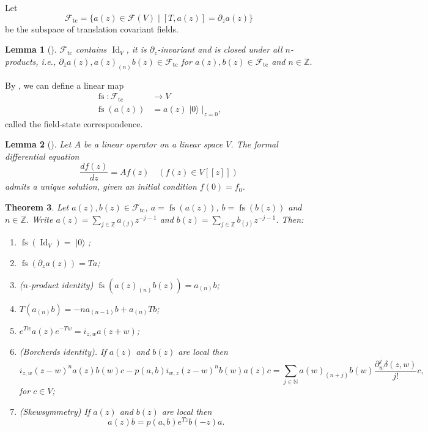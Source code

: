 \documentclass[a4paper, 12pt, reqno]{amsart}
\newtheorem{theorem}{Theorem}[section]
\newtheorem{lemma}[theorem]{Lemma}
\theoremstyle{remark}
\numberwithin{equation}{subsection}
\DeclareMathOperator{\Id}{Id}
\DeclareMathOperator{\vac}{|0\rangle}
\DeclareMathOperator{\fs}{fs}
\DeclareMathOperator{\tc}{tc}
\begin{document}
Let
\begin{equation*}
  \mathcal{F}_{\tc} = \{a(z) \in \mathcal{F}(V) \mid [T, a(z)] = \partial_za(z)\}
\end{equation*}
be the subspace of translation covariant fields.

\begin{lemma}[{\cite[Lemma 3]{callegaro_introduction_2017}}]
  \label{lmm:5}
  $\mathcal{F}_{\tc}$ contains $\Id_V$, it is $\partial_z$-invariant and is closed under all $n$-products, i.e., $\partial_za(z), a(z)_{(n)}b(z) \in \mathcal{F}_{\tc}$ for $a(z), b(z) \in \mathcal{F}_{\tc}$ and $n \in \mathbb{Z}$.
\end{lemma}

By , we can define a linear map
\begin{align*}
  \fs: \mathcal{F}_{\tc} &\to V \\
  \fs(a(z)) &= a(z)\vac|_{z = 0},
\end{align*}
called the field-state correspondence.

\begin{lemma}[{\cite[Proposition 4.3.2]{nozaradan_introduction_2008}}]
  \label{lmm:6}
  Let $A$ be a linear operator on a linear space $V$.
  The formal differential equation
  \begin{equation*}
    \frac{df(z)}{dz} = Af(z) \quad (f(z) \in V[[z]])
  \end{equation*}
  admits a unique solution, given an initial condition $f(0)=f_0$.
\end{lemma}

\begin{theorem}
  \label{thr:17}
  Let $a(z), b(z) \in \mathcal{F}_{\tc}$, $a = \fs(a(z))$, $b = \fs(b(z))$ and $n \in \mathbb{Z}$.
  Write $a(z) = \sum_{j \in \mathbb{Z}}a_{(j)}z^{-j - 1}$ and $b(z) = \sum_{j \in \mathbb{Z}}b_{(j)}z^{-j - 1}$.
  Then:
  \begin{enumerate}
  \item $\fs(\Id_V) = \vac$;
  \item $\fs(\partial_za(z)) = Ta$;
  \item ($n$-product identity) $\fs(a(z)_{(n)}b(z)) = a_{(n)}b$;
  \item $T(a_{(n)}b) = -na_{(n - 1)}b + a_{(n)}Tb$;
  \item $e^{Tw}a(z)e^{-Tw} = i_{z, w}a(z + w)$;
  \item (Borcherds identity). If $a(z)$ and $b(z)$ are local then
    \begin{equation*}
      i_{z,w}(z-w)^na(z)b(w)c-p(a,b)i_{w,z}(z-w)^nb(w)a(z)c=\sum_{j \in \mathbb{N}}a(w)_{(n+j)}b(w)\frac{\partial^j_w\delta(z,w)}{j!}c,
    \end{equation*}
    for $c \in V$;
  \item (Skewsymmetry) If $a(z)$ and $b(z)$ are local then
    \begin{equation*}
      a(z)b=p(a,b)e^{Tz}b(-z)a.
    \end{equation*}
  \end{enumerate}
\end{theorem}
\end{document}
